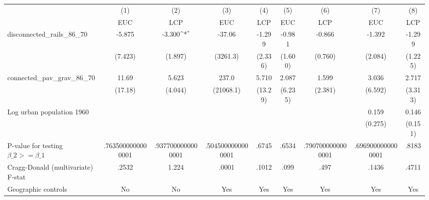 {
\def\sym#1{\ifmmode^{#1}\else\(^{#1}\)\fi}
\begin{tabular}{l*{8}{c}}
\hline\hline
                &\multicolumn{1}{c}{(1)}&\multicolumn{1}{c}{(2)}&\multicolumn{1}{c}{(3)}&\multicolumn{1}{c}{(4)}&\multicolumn{1}{c}{(5)}&\multicolumn{1}{c}{(6)}&\multicolumn{1}{c}{(7)}&\multicolumn{1}{c}{(8)}\\
                &\multicolumn{1}{c}{EUC}&\multicolumn{1}{c}{LCP}&\multicolumn{1}{c}{EUC}&\multicolumn{1}{c}{LCP}&\multicolumn{1}{c}{EUC}&\multicolumn{1}{c}{LCP}&\multicolumn{1}{c}{EUC}&\multicolumn{1}{c}{LCP}\\
\hline
disconnected\_rails\_86\_70&   -5.875         &   -3.300\sym{*}  &   -37.06         &   -1.299         &   -0.981         &   -0.866         &   -1.392         &   -1.299         \\
                &  (7.423)         &  (1.897)         & (3261.3)         &  (2.336)         &  (1.600)         &  (0.760)         &  (2.084)         &  (1.225)         \\
[1em]
connected\_pav\_grav\_86\_70&    11.69         &    5.623         &    237.0         &    5.710         &    2.087         &    1.599         &    3.036         &    2.717         \\
                &  (17.18)         &  (4.044)         &(21068.1)         &  (13.29)         &  (6.235)         &  (2.381)         &  (6.592)         &  (3.313)         \\
[1em]
Log urban population 1960&                  &                  &                  &                  &                  &                  &    0.159         &    0.146         \\
                &                  &                  &                  &                  &                  &                  &  (0.275)         &  (0.151)         \\
\hline
P-value for testing $\beta\_{2} >= \beta\_{1}$&.7635000000000001         &.9377000000000001         &.5045000000000001         &    .6745         &    .6534         &.7907000000000001         &.6969000000000001         &    .8183         \\
Cragg-Donald (multivariate) F-stat&    .2532         &    1.224         &    .0001         &    .1012         &     .099         &     .497         &    .1436         &    .4711         \\
Geographic controls&       No         &       No         &      Yes         &      Yes         &      Yes         &      Yes         &      Yes         &      Yes         \\

\end{tabular}}
